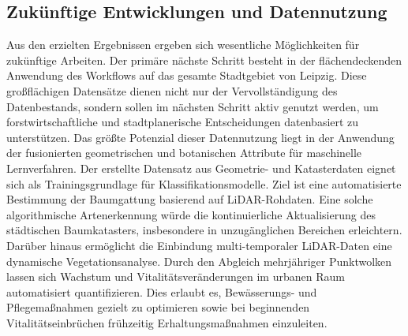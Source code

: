 \subsection{Zukünftige Entwicklungen und Datennutzung}

Aus den erzielten Ergebnissen ergeben sich wesentliche Möglichkeiten für zukünftige Arbeiten. Der primäre nächste Schritt besteht in der flächendeckenden Anwendung des Workflows auf das gesamte Stadtgebiet von Leipzig. Diese großflächigen Datensätze dienen nicht nur der Vervollständigung des Datenbestands, sondern sollen im nächsten Schritt aktiv genutzt werden, um forstwirtschaftliche und stadtplanerische Entscheidungen datenbasiert zu unterstützen. Das größte Potenzial dieser Datennutzung liegt in der Anwendung der fusionierten geometrischen und botanischen Attribute für maschinelle Lernverfahren. Der erstellte Datensatz aus Geometrie- und Katasterdaten eignet sich als Trainingsgrundlage für Klassifikationsmodelle. Ziel ist eine automatisierte Bestimmung der Baumgattung basierend auf LiDAR-Rohdaten. Eine solche algorithmische Artenerkennung würde die kontinuierliche Aktualisierung des städtischen Baumkatasters, insbesondere in unzugänglichen Bereichen erleichtern. Darüber hinaus ermöglicht die Einbindung multi-temporaler LiDAR-Daten eine dynamische Vegetationsanalyse. Durch den Abgleich mehrjähriger Punktwolken lassen sich Wachstum und Vitalitätsveränderungen im urbanen Raum automatisiert quantifizieren. Dies erlaubt es, Bewässerungs- und Pflegemaßnahmen gezielt zu optimieren sowie bei beginnenden Vitalitätseinbrüchen frühzeitig Erhaltungsmaßnahmen einzuleiten. 
